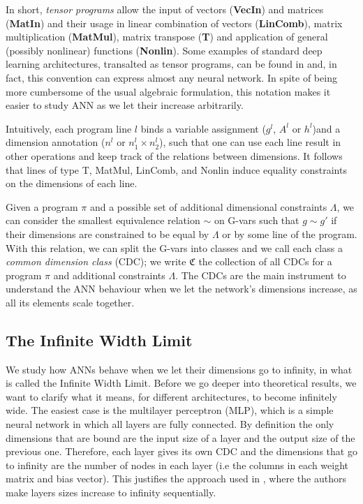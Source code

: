 \documentclass[11pt,notitlepage]{article}
\numberwithin{equation}{section}
\theoremstyle{remark}
\theoremstyle{definition}
\begin{document}
	In short, \emph{tensor programs} allow the input of vectors (\textbf{VecIn}) and matrices (\textbf{MatIn}) and their usage in linear combination of vectors (\textbf{LinComb}), matrix multiplication (\textbf{MatMul}), matrix transpose (\textbf{T}) and application of general (possibly nonlinear) functions (\textbf{Nonlin}).
	Some examples of standard deep learning architectures, transalted as tensor programs, can be found in \cite[Section 3]{yang2019scaling} and, in fact, this convention can express almost any neural network.
	In spite of being more cumbersome of the usual algebraic formulation, this notation makes it easier to study ANN as we let their increase arbitrarily.
	
	Intuitively, each program line $l$ binds a variable assignment ($g^l$, $A^l$ or $h^l$)and a dimension annotation ($n^l$ or $n^l_1 \times n^l_2$), such that one can use each line result in other operations and keep track of the relations between dimensions.
	It follows that lines of type T, MatMul, LinComb, and Nonlin induce equality constraints on the dimensions of each line.
	
	Given a program $\pi$ and a possible set of additional dimensional constraints $\Lambda$, we can consider the smallest equivalence relation $\sim$ on G-vars such that $g \sim g'$ if their dimensions are constrained to be equal by $\Lambda$ or by some line of the program.
	With this relation, we can split the G-vars into classes and we call each class a \emph{common dimension class} (CDC); we write $\mathfrak{C}$ the collection of all CDCs for a program $\pi$ and additional constraints $\Lambda$.
	The CDCs are the main instrument to understand the ANN behaviour when we let the network's dimensions increase, as all its elements scale together.
	
	\subsection{The Infinite Width Limit}\label{subsec:iwl}
	
	We study how ANNs behave when we let their dimensions go to infinity, in what is called the Infinite Width Limit.
	Before we go deeper into theoretical results, we want to clarify what it means, for different architectures, to become infinitely wide.
	The easiest case is the multilayer perceptron (MLP), which is a simple neural network in which all layers are fully connected.
	By definition the only dimensions that are bound are the input size of a layer and the output size of the previous one.
	Therefore, each layer gives its own CDC and the dimensions that go to infinity are the number of nodes in each layer (i.e the columns in each weight matrix and bias vector).
	This justifies the approach used in \cite{jacot2018neural}, where the authors make layers sizes increase to infinity sequentially.
	
\end{document}
